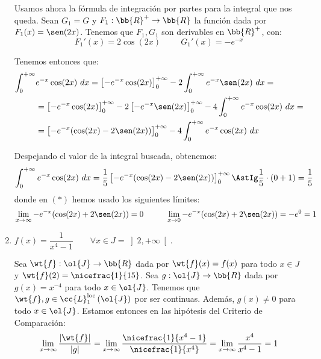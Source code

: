 \begin{ejercicio}
\begin{enumerate}
        Usamos ahora la fórmula de integración por partes para la integral que nos queda.
        Sean $G_1=G$ y $F_1:\bb{R}^+\to \bb{R}$ la función dada por $F_1(x) = \sen(2x)$.
        Tenemos que $F_1,G_1$ son derivables en $\bb{R}^+$, con:
        \begin{equation*}
            F_1'(x) = 2\cos(2x) \hspace{1cm} G_1'(x) = -e^{-x}
        \end{equation*}

        Tenemos entonces que:
        \begin{align*}
            \int_0^{+\infty}& e^{-x}\cos(2x)~dx
            = \left[-e^{-x}\cos(2x)\right]_0^{+\infty} - 2\int_0^{+\infty} e^{-x}\sen(2x)~dx
            =\\&= \left[-e^{-x}\cos(2x)\right]_0^{+\infty} - 2\left[-e^{-x}\sen(2x)\right]_0^{+\infty} - 4\int_0^{+\infty}e^{-x}\cos(2x)~dx
            =\\&= \left[-e^{-x}(\cos(2x)-2\sen(2x))\right]_0^{+\infty} - 4\int_0^{+\infty}e^{-x}\cos(2x)~dx
        \end{align*}

        Despejando el valor de la integral buscada, obtenemos:
        \begin{equation*}
            \int_0^{+\infty} e^{-x}\cos(2x)~dx = \frac{1}{5}\left[-e^{-x}(\cos(2x)-2\sen(2x))\right]_0^{+\infty} \AstIg \frac{1}{5}\cdot (0+1) = \frac{1}{5}
        \end{equation*}
        donde en $(\ast)$ hemos usado los siguientes límites:
        \begin{equation*}
            \lim_{x\to \infty} -e^{-x}(\cos(2x)+2\sen(2x)) = 0
            \hspace{1cm}
            \lim_{x\to 0} -e^{-x}(\cos(2x)+2\sen(2x)) = -e^0=1
        \end{equation*}


        \item $f(x)=\dfrac{1}{x^4-1} \qquad \forall x\in J=\left]2,+\infty\right[$.
        
        Sea $\wt{f}:\ol{J}\to \bb{R}$ dada por $\wt{f}(x)=f(x)$ para todo $x\in J$ y $\wt{f}(2)=\nicefrac{1}{15}$.
        Sea $g:\ol{J}\to \bb{R}$ dada por $g(x)=x^{-4}$ para todo $x\in \ol{J}$. Tenemos que $\wt{f},g\in \cc{L}_1^{\text{loc}}\left(\ol{J}\right)$ por ser continuas.
        Además, $g(x)\neq 0$ para todo $x\in \ol{J}$. Estamos entonces en las hipótesis del Criterio de Comparación:
        \begin{equation*}
            \lim_{x\to \infty} \dfrac{|\wt{f}|}{|g|} = \lim_{x\to \infty} \dfrac{\nicefrac{1}{x^4-1}}{\nicefrac{1}{x^4}} = \lim_{x\to \infty} \dfrac{x^4}{x^4-1} = 1
        \end{equation*}


\end{enumerate}
\end{ejercicio}
